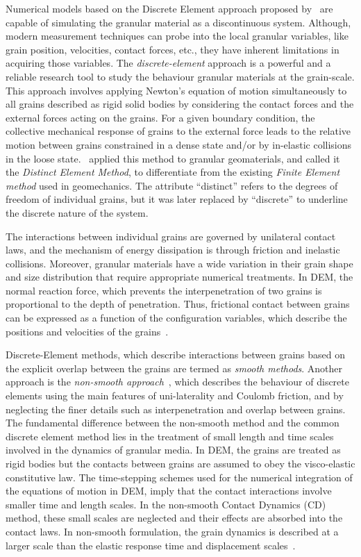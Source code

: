 Numerical models based on the Discrete Element approach proposed 
by~\citet{Cundall1979a} are capable of simulating the granular material as a 
discontinuous system. Although, modern measurement techniques can probe into 
the local granular variables, like grain position, velocities, contact 
forces, etc., they have inherent limitations in acquiring those variables. The 
\textit{discrete-element} approach is a powerful and a reliable research tool 
to study the behaviour granular materials at the grain-scale. This approach 
involves applying Newton's equation of motion simultaneously to all grains 
described as rigid solid bodies by considering the contact forces and the 
external forces acting on the grains. For a given boundary condition, the 
collective mechanical response of grains to the external force leads to the 
relative motion between grains constrained in a dense state and/or by 
in-elastic collisions in the loose state.~\citet{Cundall1979a} applied this 
method to granular geomaterials, and called it the \textit{Distinct Element 
Method}, to differentiate from the existing \textit{Finite Element method} used 
in geomechanics. The attribute ``distinct'' refers to the degrees of freedom of 
individual grains, but it was later replaced by ``discrete'' to underline 
the discrete nature of the system. 

The interactions between individual grains are governed by unilateral contact 
laws, and the mechanism of energy dissipation is through friction and inelastic 
collisions. Moreover, granular materials have a wide variation in their 
grain shape and size distribution that require appropriate numerical 
treatments. In DEM, the normal reaction force, 
which prevents the interpenetration of two grains is proportional to the depth 
of penetration. Thus, frictional contact between grains can be expressed 
as a function of the configuration variables, which describe the positions and 
velocities of the grains~\citep{Radjai2011}.

Discrete-Element methods, which describe interactions between grains based on 
the explicit overlap between the grains are termed as \textit{smooth methods}. 
Another approach is the \textit{non-smooth approach}~\citep{Jean1999}, which 
describes the behaviour of discrete elements using the main features of 
uni-laterality and Coulomb friction, and by neglecting the finer details such 
as interpenetration and overlap between grains. The fundamental difference 
between the non-smooth method and the common discrete element method 
lies in the treatment of small length and time scales involved 
in the dynamics of granular media. In DEM, the grains are treated 
as rigid bodies but the contacts between grains are assumed to obey the 
visco-elastic constitutive law. The time-stepping schemes used for the 
numerical integration of the equations of motion in DEM, 
imply that the contact interactions involve smaller time and length scales. In 
the non-smooth Contact Dynamics (CD) method, these small scales are neglected 
and their effects are absorbed into the contact laws. In non-smooth 
formulation, the grain dynamics is described at a larger scale than the elastic 
response time and displacement scales~\citep{Jean1999, Radjai2009}. 

